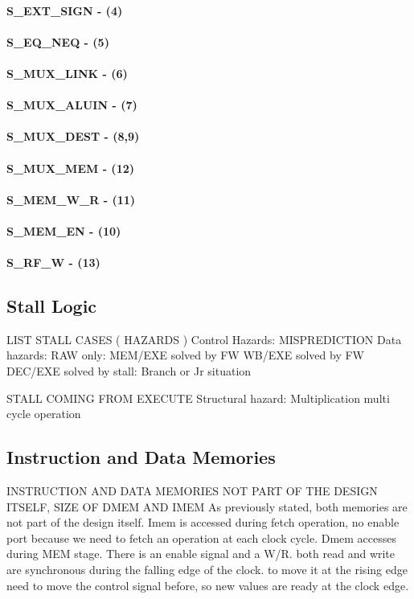 \documentclass[12pt]{article}
\begin{document}
\paragraph{S\_EXT\_SIGN - (4)}
\paragraph{S\_EQ\_NEQ - (5)}
\paragraph{S\_MUX\_LINK - (6)}
\paragraph{S\_MUX\_ALUIN - (7)}
\paragraph{S\_MUX\_DEST - (8,9)}
\paragraph{S\_MUX\_MEM - (12)}
\paragraph{S\_MEM\_W\_R - (11)}
\paragraph{S\_MEM\_EN - (10)}
\paragraph{S\_RF\_W - (13)}

\subsection{Stall Logic}
LIST STALL CASES ( HAZARDS )
Control Hazards: MISPREDICTION
Data hazards: RAW only:
MEM/EXE solved by FW
WB/EXE solved by FW
DEC/EXE solved by stall: Branch or Jr situation

STALL COMING FROM EXECUTE
Structural hazard: Multiplication multi cycle operation

\subsection{Instruction and Data Memories}
INSTRUCTION AND DATA MEMORIES NOT PART OF THE DESIGN ITSELF, SIZE OF DMEM AND IMEM
As previously stated, both memories are not part of the design itself.
Imem is accessed during fetch operation, no enable port because we need to fetch an operation at each clock cycle.
Dmem accesses during MEM stage. There is an enable signal and a W/R. both read and write are synchronous during the falling edge of the clock. to move it at the rising edge need to move the control signal before, so new values are ready at the clock edge.
\end{document}
